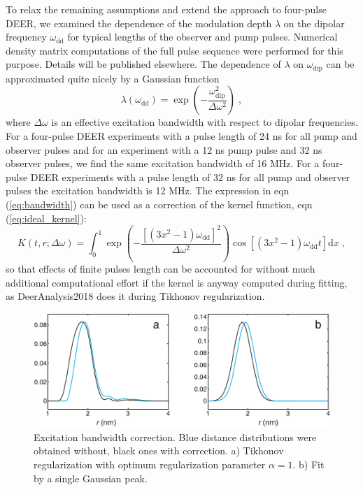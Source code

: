 \documentclass{article}
\begin{document}
To relax the remaining assumptions and extend the approach to four-pulse DEER, we examined the dependence of the modulation depth $\lambda$ on the dipolar frequency $\omega_{\mathrm{dd}}$ for typical lengths of the observer and pump pulses. Numerical density matrix computations of the full pulse sequence were performed for this purpose. Details will be published elsewhere. The dependence of $\lambda$ on $\omega_{\mathrm{dip}}$ can be approximated quite nicely by a Gaussian function
\begin{equation}
	\lambda \left( \omega_{\mathrm{dd}} \right) = \exp \left( - \frac{\omega_{\mathrm{dip}}^2}{\Delta \omega ^2} \right) \; ,
	\label{eq:bandwidth}
\end{equation}
where $\Delta \omega$ is an effective excitation bandwidth with respect to dipolar frequencies. For a four-pulse DEER experiments with a pulse length of 24 ns for all pump and observer pulses and for an experiment with a 12 ns pump pulse and 32 ns observer pulses, we find the same excitation bandwidth of 16 MHz. For a four-pulse DEER experiments with a pulse length of 32 ns for all pump and observer pulses the excitation bandwidth is 12 MHz. The expression in eqn (\ref{eq:bandwidth}) can be used as a correction of the kernel function, eqn (\ref{eq:ideal_kernel}):
\begin{equation}
	K \left( t, r; \Delta \omega \right) = \int _0 ^1 \exp \left( - \frac{\left[ \left( 3x^2-1 \right) \omega_{\mathrm{dd}}\right]^2}{\Delta \omega ^2} \right) \cos \left[ \left( 3x^2-1 \right) \omega_{\mathrm{dd}} t \right] \mathrm{d}x \; ,
	\label{eq:real_kernel}
\end{equation}
so that effects of finite pulses length can be accounted for without much additional computational effort if the kernel is anyway computed during fitting, as DeerAnalysis2018 does it during Tikhonov regularization. 


\begin{figure}[ht]
 	\begin{center}
  \includegraphics[width=1.0\textwidth]{fig7.pdf}
	\end{center}
	\caption{Excitation bandwidth correction. Blue distance distributions were obtained without, black ones with correction. a) Tikhonov regularization with optimum regularization parameter $\alpha=1$. b) Fit by a single Gaussian peak.}
	\label{fig:manfig7}
\end{figure}
\end{document}

